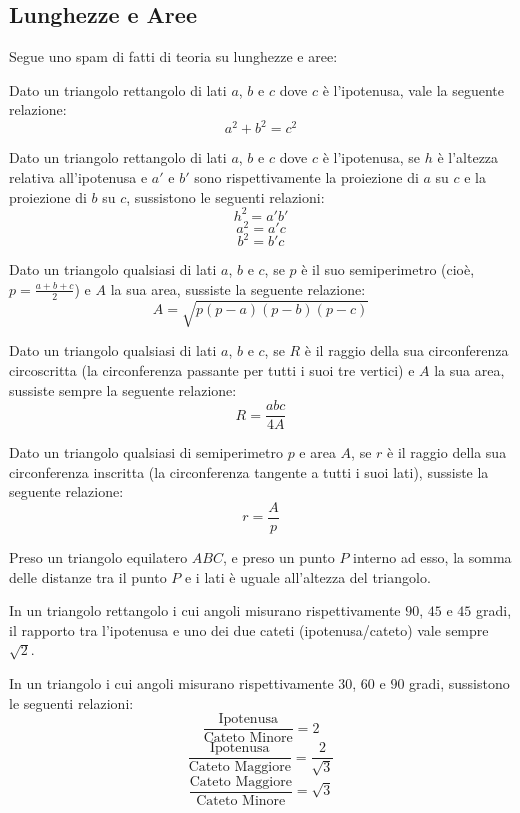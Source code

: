 \documentclass[11pt]{scrartcl}
\begin{document}
	\subsection{Lunghezze e Aree}
	Segue uno spam di fatti di teoria su lunghezze e aree:
	\begin{theorem}[Pitagora]
		Dato un triangolo rettangolo di lati $a$, $b$ e $c$ dove $c$ è l'ipotenusa, vale la seguente relazione:
		$$a^2+b^2=c^2$$
	\end{theorem}
	\begin{theorem}[Euclide]
		Dato un triangolo rettangolo di lati $a$, $b$ e $c$ dove $c$ è l'ipotenusa, se $h$ è l'altezza relativa all'ipotenusa e $a'$ e $b'$ sono rispettivamente la proiezione di $a$ su $c$ e la proiezione di $b$ su $c$, sussistono le seguenti relazioni:
		$$h^2=a'b'$$
		$$a^2=a'c$$
		$$b^2=b'c$$
	\end{theorem}
	\begin{theorem}[Erone]
		Dato un triangolo qualsiasi di lati $a$, $b$ e $c$, se $p$ è il suo semiperimetro (cioè, $p=\frac{a+b+c}{2}$) e $A$ la sua area, sussiste la seguente relazione:
		$$A=\sqrt{p(p-a)(p-b)(p-c)}$$
	\end{theorem}
	\begin{theorem}[Circumraggio]
		Dato un triangolo qualsiasi di lati $a$, $b$ e $c$, se $R$ è il raggio della sua circonferenza circoscritta (la circonferenza passante per tutti i suoi tre vertici) e $A$ la sua area, sussiste sempre la seguente relazione:
		$$R=\frac{abc}{4A}$$
	\end{theorem}
	\begin{theorem}[Inraggio]
		Dato un triangolo qualsiasi di semiperimetro $p$ e area $A$, se $r$ è il raggio della sua circonferenza inscritta (la circonferenza tangente a tutti i suoi lati), sussiste la seguente relazione:
		$$r=\frac{A}{p}$$
	\end{theorem}
	\begin{theorem}[Viviani]
		Preso un triangolo equilatero $ABC$, e preso un punto $P$ interno ad esso, la somma delle distanze tra il punto $P$ e i lati è uguale all'altezza del triangolo.
	\end{theorem}
	\begin{theorem}[Triangolo da $45$-$45$]
		In un triangolo rettangolo i cui angoli misurano rispettivamente $90$, $45$ e $45$ gradi, il rapporto tra l'ipotenusa e uno dei due cateti (ipotenusa/cateto) vale sempre $\sqrt{2}$.
	\end{theorem}
	\begin{theorem}[Triangolo da $30$-$60$]
		In un triangolo i cui angoli misurano rispettivamente $30$, $60$ e $90$ gradi, sussistono le seguenti relazioni:
		$$\frac{\text{Ipotenusa}}{\text{Cateto Minore}}=2$$
		$$\frac{\text{Ipotenusa}}{\text{Cateto Maggiore}}=\frac{2}{\sqrt{3}}$$
		$$\frac{\text{Cateto Maggiore}}{\text{Cateto Minore}}=\sqrt{3}$$
	\end{theorem}
\end{document}

